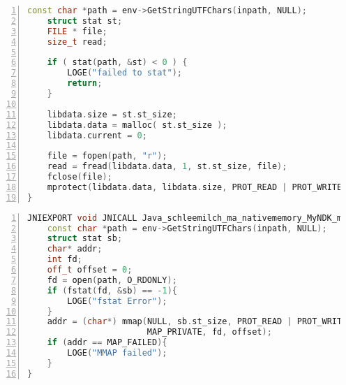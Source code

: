 \begin{appendices}
\begin{lstlisting}[language=C++, caption=File Mapping with malloc(), label=file_mapping_malloc, numbers=left]
    const char *path = env->GetStringUTFChars(inpath, NULL);
    struct stat st;
    FILE * file;
    size_t read;

    if ( stat(path, &st) < 0 ) {
        LOGE("failed to stat");
        return;
    }

    libdata.size = st.st_size;
    libdata.data = malloc( st.st_size );
    libdata.current = 0;

    file = fopen(path, "r");
    read = fread(libdata.data, 1, st.st_size, file);
    fclose(file);
    mprotect(libdata.data, libdata.size, PROT_READ | PROT_WRITE | PROT_EXEC)
}
\end{lstlisting}
\begin{lstlisting}[language=C++, caption=File Mapping with mmap(), label=file_mapping_mmap, numbers=left]
JNIEXPORT void JNICALL Java_schleemilch_ma_nativememory_MyNDK_mmapFile (JNIEnv *env, jobject obj, jstring inpath){
    const char *path = env->GetStringUTFChars(inpath, NULL);
    struct stat sb;
    char* addr;
    int fd;
    off_t offset = 0;
    fd = open(path, O_RDONLY);
    if (fstat(fd, &sb) == -1){
        LOGE("fstat Error");
    }
    addr = (char*) mmap(NULL, sb.st_size, PROT_READ | PROT_WRITE | PROT_EXEC,
                        MAP_PRIVATE, fd, offset);
    if (addr == MAP_FAILED){
        LOGE("MMAP failed");
    }
}
\end{lstlisting}
\end{appendices}